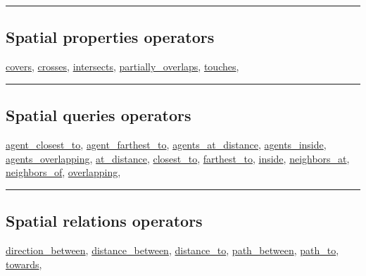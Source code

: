 \documentclass[]{book}
\theoremstyle{definition}
\theoremstyle{definition}
\theoremstyle{definition}
\theoremstyle{remark}
\begin{document}
\begin{center}\rule{0.5\linewidth}{\linethickness}\end{center}

\subsection{Spatial properties
operators}\label{spatial-properties-operators}

\href{operators-b-to-c.html\#covers}{covers},
\href{operators-b-to-c.html\#crosses}{crosses},
\href{operators-i-to-m.html\#intersects}{intersects},
\href{operators-n-to-r.html\#partially_overlaps}{partially\_overlaps},
\href{operators-s-to-z.html\#touches}{touches},

\begin{center}\rule{0.5\linewidth}{\linethickness}\end{center}

\subsection{Spatial queries operators}\label{spatial-queries-operators}

\href{operators-a-to-a.html\#agent_closest_to}{agent\_closest\_to},
\href{operators-a-to-a.html\#agent_farthest_to}{agent\_farthest\_to},
\href{operators-a-to-a.html\#agents_at_distance}{agents\_at\_distance},
\href{operators-a-to-a.html\#agents_inside}{agents\_inside},
\href{operators-a-to-a.html\#agents_overlapping}{agents\_overlapping},
\href{operators-a-to-a.html\#at_distance}{at\_distance},
\href{operators-b-to-c.html\#closest_to}{closest\_to},
\href{operators-d-to-h.html\#farthest_to}{farthest\_to},
\href{operators-i-to-m.html\#inside}{inside},
\href{operators-n-to-r.html\#neighbors_at}{neighbors\_at},
\href{operators-n-to-r.html\#neighbors_of}{neighbors\_of},
\href{operators-n-to-r.html\#overlapping}{overlapping},

\begin{center}\rule{0.5\linewidth}{\linethickness}\end{center}

\subsection{Spatial relations
operators}\label{spatial-relations-operators}

\href{operators-d-to-h.html\#direction_between}{direction\_between},
\href{operators-d-to-h.html\#distance_between}{distance\_between},
\href{operators-d-to-h.html\#distance_to}{distance\_to},
\href{operators-n-to-r.html\#path_between}{path\_between},
\href{operators-n-to-r.html\#path_to}{path\_to},
\href{operators-s-to-z.html\#towards}{towards},
\end{document}
